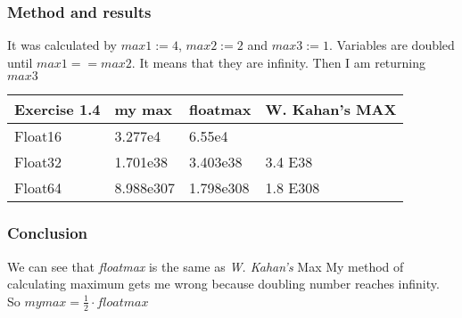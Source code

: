 \documentclass[12pt]{article}
\begin{document}
\subsubsection*{Method and results}
It was calculated by $max1 := 4$, $max2 := 2$ and $max3:=1$. 
Variables are doubled until $max1 == max2$. It means that they are infinity. 
Then I am returning $max3$ 
\begin{table}[!ht]
    \centering
    \begin{tabular}{|l|l|l|l|}
    \hline
        Exercise 1.4 & my max & floatmax & W. Kahan's MAX \\ \hline
        Float16 & 3.277e4 & 6.55e4 & ~ \\ \hline
        Float32 & 1.701e38 & 3.403e38 & 3.4 E38 \\ \hline
        Float64 & 8.988e307 & 1.798e308 & 1.8 E308 \\ \hline
    \end{tabular}
\end{table}
\subsubsection*{Conclusion}
We can see that \emph{floatmax} is the same as \emph{W. Kahan's} Max \newline
My method of calculating maximum gets me wrong because doubling number reaches infinity. 
So $my max = \frac{1}{2} \cdot floatmax$
\end{document}
